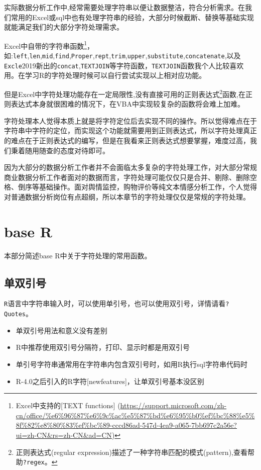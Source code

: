 \documentclass[
]{book}
\begin{document}
实际数据分析工作中,经常需要处理字符串以便让数据整洁，符合分析需求。在我们常用的Excel或sql中也有处理字符串的经验，大部分时候截断、替换等基础实现就能满足我们的大部分字符处理需求。

Excel中自带的字符串函数\footnote{Excel中支持的{[}TEXT functions{]} (\url{https://support.microsoft.com/zh-cn/office/\%e6\%96\%87\%e6\%9c\%ac\%e5\%87\%bd\%e6\%95\%b0\%ef\%bc\%88\%e5\%8f\%82\%e8\%80\%83\%ef\%bc\%89-cccd86ad-547d-4ea9-a065-7bb697c2a56e?ui=zh-CN\&rs=zh-CN\&ad=CN})}，如:\texttt{left},\texttt{len},\texttt{mid},\texttt{find},\texttt{Proper},\texttt{rept},\texttt{trim},\texttt{upper},\texttt{substitute},\texttt{concatenate},以及\texttt{Excle}2019新出的\texttt{concat},\texttt{TEXTJOIN}等字符函数，\texttt{TEXTJOIN}函数我个人比较喜欢用。在学习R的字符处理时候可以自行尝试实现以上相对应功能。

但是Excel中字符处理功能存在一定局限性,没有直接可用的正则表达式\footnote{正则表达式(regular expression)描述了一种字符串匹配的模式(pattern),查看帮助\texttt{?regex}。}函数,在正则表达式本身就很困难的情况下，在VBA中实现较复杂的函数将会难上加难。

字符处理本人觉得本质上就是将字符定位后去实现不同的操作。所以觉得难点在于字符串中字符的定位，而实现这个功能就需要用到正则表达式，所以字符处理真正的难点在于正则表达式的编写，但是在我看来正则表达式想要掌握，难度过高，我们秉着随用随查的态度对待即可。

因为大部分的数据分析工作者并不会面临太多复杂的字符处理工作，对大部分常规商业数据分析工作者面对的数据而言，字符处理可能仅仅只是合并、剔除、删除空格、倒序等基础操作。面对舆情监控，购物评价等纯文本情感分析工作，个人觉得对普通数据分析岗位有点超纲，所以本章节的字符处理仅仅是常规的字符处理。

\hypertarget{character:base-R}{%
\section{base R}\label{character:base-R}}

本部分简述base R中关于字符处理的常用函数。

\hypertarget{ux5355ux53ccux5f15ux53f7}{%
\subsection{单双引号}\label{ux5355ux53ccux5f15ux53f7}}

\texttt{R}语言中字符串输入时，可以使用单引号，也可以使用双引号，详情请看\texttt{?Quotes}。

\begin{itemize}
\item
  单双引号用法和意义没有差别
\item
  R中推荐使用双引号分隔符，打印、显示时都是用双引号
\item
  单引号字符串通常用在字符串内包含双引号时，如用R执行sql字符串代码时
\item
  R-4.0之后引入的R字符{[}newfeatures{]}，让单双引号基本没区别
\end{itemize}
\end{document}
